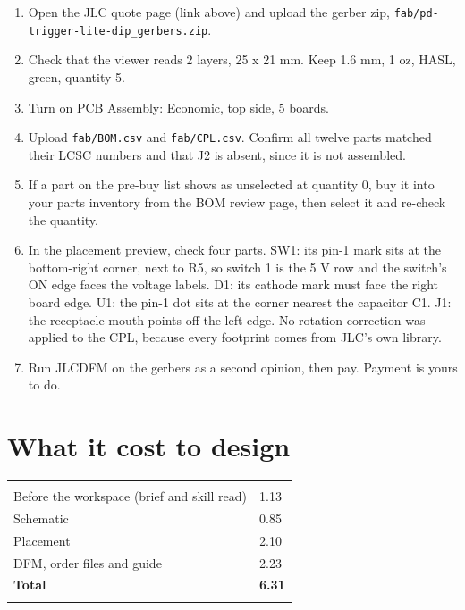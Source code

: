 
\begin{enumerate}
\item Open the JLC quote page (link above) and upload the gerber zip,
\texttt{fab/pd-trigger-lite-dip\_gerbers.zip}.
\item Check that the viewer reads 2 layers, 25 x 21 mm. Keep 1.6 mm, 1 oz, HASL, green, quantity 5.
\item Turn on PCB Assembly: Economic, top side, 5 boards.
\item Upload \texttt{fab/BOM.csv} and \texttt{fab/CPL.csv}. Confirm all twelve parts matched their
LCSC numbers and that J2 is absent, since it is not assembled.
\item If a part on the pre-buy list shows as unselected at quantity 0, buy it into your parts
inventory from the BOM review page, then select it and re-check the quantity.
\item In the placement preview, check four parts. SW1: its pin-1 mark sits at the bottom-right
corner, next to R5, so switch 1 is the 5 V row and the switch's ON edge faces the voltage labels. D1: its cathode mark must face the right board edge. U1: the pin-1 dot sits at
the corner nearest the capacitor C1. J1: the receptacle mouth points off the left edge. No
rotation correction was applied to the CPL, because every footprint comes from JLC's own library.
\item Run JLCDFM on the gerbers as a second opinion, then pay. Payment is yours to do.
\end{enumerate}

\section{What it cost to design}

\begin{hsblock}
\begin{tabularx}{\linewidth}{Y R{2.2cm}}
\hstoprule
{} &  \\
\hstoprule
Before the workspace (brief and skill read) & 1.13 \\ \hline
Schematic & 0.85 \\ \hline
Placement & 2.10 \\ \hline
DFM, order files and guide & 2.23 \\
\hstoprule
\textbf{Total} & \textbf{6.31} \\
\hstoprule
\end{tabularx}
\end{hsblock}

